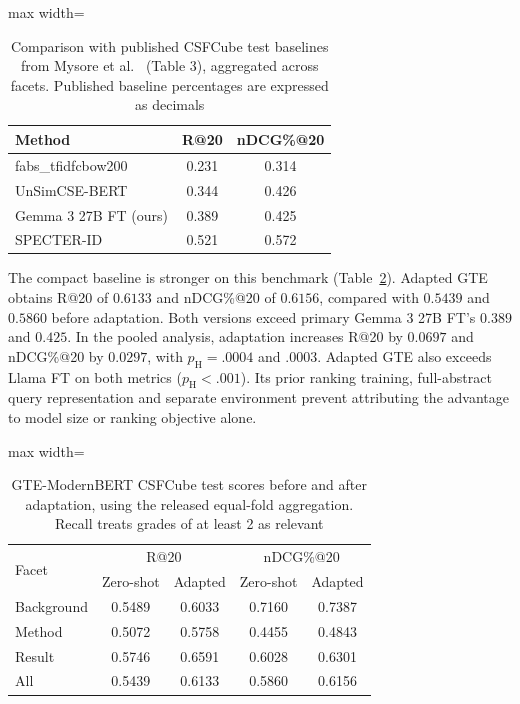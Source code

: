 \documentclass[pdflatex,sn-basic,Numbered]{sn-jnl}%
\theoremstyle{thmstyleone}%
\theoremstyle{thmstyletwo}%
\theoremstyle{thmstylethree}%
\begin{document}
\begin{table}[htbp]


\centering
\footnotesize
\setlength{\tabcolsep}{5pt}
\renewcommand{\arraystretch}{1.1}
\begin{adjustbox}{max width=\linewidth}
\begin{tabular}{l c c}
\hline
Method & R@20 & nDCG\%@20 \\
\hline
fabs\_tfidfcbow200 & 0.231 & 0.314 \\
UnSimCSE-BERT      & 0.344 & 0.426 \\
Gemma 3 27B FT (ours) & 0.389 & 0.425 \\
SPECTER-ID         & 0.521 & 0.572 \\
\hline
\end{tabular}
\end{adjustbox}


\caption{Comparison with published CSFCube test baselines from Mysore et al.~\cite{Mysore} (Table 3), aggregated across facets. Published baseline percentages are expressed as decimals}
\label{tab:csfcube-external-baselines}
\end{table}

The compact baseline is stronger on this benchmark
(Table~\ref{tab:compact-csfcube}). Adapted GTE obtains R@20 of $0.6133$ and
nDCG\%@20 of $0.6156$, compared with $0.5439$ and $0.5860$ before adaptation.
Both versions exceed primary Gemma 3 27B FT's $0.389$ and $0.425$.
In the pooled analysis, adaptation increases R@20 by $0.0697$ and nDCG\%@20
by $0.0297$, with $p_{\mathrm{H}}=.0004$ and $.0003$. Adapted GTE also exceeds
Llama FT on both metrics ($p_{\mathrm{H}}<.001$). Its prior ranking training,
full-abstract query representation and separate environment prevent attributing
the advantage to model size or ranking objective alone.

\begin{table}[ht]


\centering
\footnotesize
\setlength{\tabcolsep}{3pt}
\begin{adjustbox}{max width=\linewidth}
\begin{tabular}{l c c c c}
\hline
\multirow{2}{*}{Facet} & \multicolumn{2}{c}{R@20}
 & \multicolumn{2}{c}{nDCG\%@20} \\
 & Zero-shot & Adapted & Zero-shot & Adapted \\
\hline
Background & 0.5489 & 0.6033 & 0.7160 & 0.7387 \\
Method     & 0.5072 & 0.5758 & 0.4455 & 0.4843 \\
Result     & 0.5746 & 0.6591 & 0.6028 & 0.6301 \\
All        & 0.5439 & 0.6133 & 0.5860 & 0.6156 \\
\hline
\end{tabular}
\end{adjustbox}


\caption{GTE-ModernBERT CSFCube test scores before and after adaptation, using the released equal-fold aggregation. Recall treats grades of at least 2 as relevant}
\label{tab:compact-csfcube}
\end{table}
\end{document}
